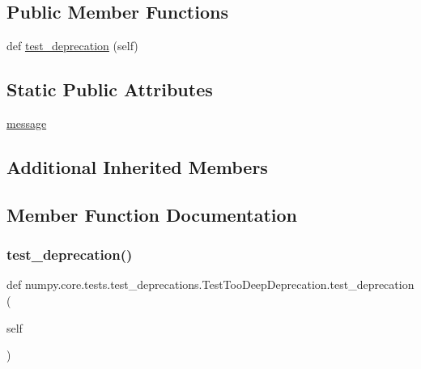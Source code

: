 \subsection*{Public Member Functions}
\begin{DoxyCompactItemize}
\item 
def \hyperlink{classnumpy_1_1core_1_1tests_1_1test__deprecations_1_1TestTooDeepDeprecation_a9c6e8a529bb490e2acd80dce76ad9ab2}{test\+\_\+deprecation} (self)
\end{DoxyCompactItemize}
\subsection*{Static Public Attributes}
\begin{DoxyCompactItemize}
\item 
\hyperlink{classnumpy_1_1core_1_1tests_1_1test__deprecations_1_1TestTooDeepDeprecation_a361eb05fe314e02b54cc38b1070c95a5}{message}
\end{DoxyCompactItemize}
\subsection*{Additional Inherited Members}


\subsection{Member Function Documentation}
\mbox{\label{classnumpy_1_1core_1_1tests_1_1test__deprecations_1_1TestTooDeepDeprecation_a9c6e8a529bb490e2acd80dce76ad9ab2}} 
\subsubsection{\texorpdfstring{test\+\_\+deprecation()}{test\_deprecation()}}
{\footnotesize\ttfamily def numpy.\+core.\+tests.\+test\+\_\+deprecations.\+Test\+Too\+Deep\+Deprecation.\+test\+\_\+deprecation (\begin{DoxyParamCaption}\item[{}]{self }\end{DoxyParamCaption})}



